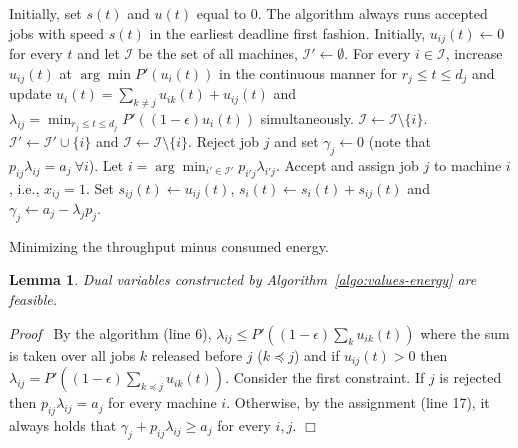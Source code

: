 \documentclass[11pt]{article}
\newenvironment{proof}{\noindent\emph{Proof\ }}{\hspace*{\fill}$\Box$\medskip}
\newtheorem{lemma}{Lemma}
\begin{document}
\begin{algorithm}[ht]
\begin{algorithmic}[1] 
\STATE Initially, set $s(t)$ and $u(t)$ equal to 0.
\STATE The algorithm always runs accepted jobs with speed $s(t)$ in the earliest deadline 
	first fashion. 
	\STATE Initially, $u_{ij}(t) \gets 0$ for every $t$ and let $\mathcal{I}$ be the set of all machines,
		$\mathcal{I'} \gets \emptyset$.
		\STATE For every $i \in \mathcal{I}$, 
		increase $u_{ij}(t)$ at $\arg \min P'(u_{i}(t))$ in the continuous manner for $r_{j} \leq t \leq d_{j}$
		and update $u_{i}(t) = \sum_{k \neq j} u_{ik}(t) + u_{ij}(t)$ and 
		$\lambda_{ij} = \min_{r_{j} \leq t \leq d_{j}} P'((1-\epsilon)u_{i}(t))$ simultaneously. 
			\STATE $\mathcal{I} \gets \mathcal{I} \setminus \{i\}$.
		\ENDIF
			\STATE $\mathcal{I'} \gets \mathcal{I'} \cup \{i\}$ and  $\mathcal{I} \gets \mathcal{I} \setminus \{i\}$.
		\ENDIF
	\ENDWHILE
		\STATE Reject job $j$ and set $\gamma_{j} \gets 0$ (note that $p_{ij}\lambda_{ij} = a_{j} ~\forall i$).
	\ELSE
		\STATE Let $i = \arg \min_{i' \in \mathcal{I'}} p_{i'j}\lambda_{i'j}$.
		\STATE Accept and assign job $j$ to machine $i$, i.e., $x_{ij} = 1$.
		\STATE Set $s_{ij}(t) \gets u_{ij}(t)$, $s_{i}(t) \gets s_{i}(t) + s_{ij}(t)$
				and $\gamma_{j} \gets a_{j} - \lambda_{j}p_{j}$.
	\ENDIF
\ENDFOR
\end{algorithmic}
\caption{Minimizing the throughput minus consumed energy.}
\label{algo:values-energy}
\end{algorithm}

\begin{lemma}
Dual variables constructed by Algorithm~\ref{algo:values-energy} are feasible.
\end{lemma}
\begin{proof}
By the algorithm (line 6), $\lambda_{ij} \leq P'((1-\epsilon)\sum_{k} u_{ik}(t))$ 
where the sum is taken over all jobs $k$ released before $j$ ($k \preceq j$) and
if $u_{ij}(t) > 0$ then $\lambda_{ij} = P'((1-\epsilon)\sum_{k \preceq j} u_{ik}(t))$. 
Consider the first constraint. If $j$ is rejected then $p_{ij} \lambda_{ij} = a_{j}$ for every machine $i$.
Otherwise, by the assignment (line 17),
it always holds that $\gamma_{j} + p_{ij}\lambda_{ij} \geq a_{j}$ for every $i,j$.
\end{proof}
\end{document}
